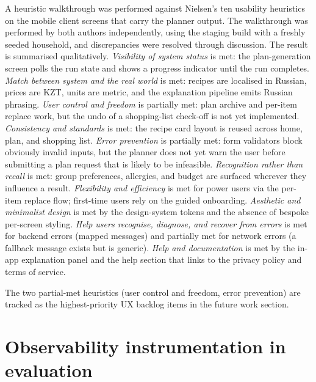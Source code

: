 A heuristic walkthrough was performed against Nielsen's ten usability heuristics \cite{nielsen2024shneiderman} on the mobile client screens that carry the planner output. The walkthrough was performed by both authors independently, using the staging build with a freshly seeded household, and discrepancies were resolved through discussion. The result is summarised qualitatively. \emph{Visibility of system status} is met: the plan-generation screen polls the run state and shows a progress indicator until the run completes. \emph{Match between system and the real world} is met: recipes are localised in Russian, prices are KZT, units are metric, and the explanation pipeline emits Russian phrasing. \emph{User control and freedom} is partially met: plan archive and per-item replace work, but the undo of a shopping-list check-off is not yet implemented. \emph{Consistency and standards} is met: the recipe card layout is reused across home, plan, and shopping list. \emph{Error prevention} is partially met: form validators block obviously invalid inputs, but the planner does not yet warn the user before submitting a plan request that is likely to be infeasible. \emph{Recognition rather than recall} is met: group preferences, allergies, and budget are surfaced wherever they influence a result. \emph{Flexibility and efficiency} is met for power users via the per-item replace flow; first-time users rely on the guided onboarding. \emph{Aesthetic and minimalist design} is met by the design-system tokens and the absence of bespoke per-screen styling. \emph{Help users recognise, diagnose, and recover from errors} is met for backend errors (mapped messages) and partially met for network errors (a fallback message exists but is generic). \emph{Help and documentation} is met by the in-app explanation panel and the help section that links to the privacy policy and terms of service.

The two partial-met heuristics (user control and freedom, error prevention) are tracked as the highest-priority UX backlog items in the future work section.

\section{Observability instrumentation in evaluation}

